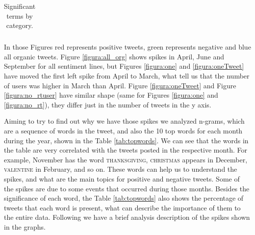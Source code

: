 \documentclass{sig-alternate}
\begin{document}
\begin{table}[t]
\centering
\caption{Significant terms by category.}
\label{tab:terms}
\begin{tabular}{|r|p{14cm}| }
\hline

\hline
\end{tabular}
\end{table}




 In those Figures red represents positive tweets, green represents negative and blue all organic tweets. Figure \ref{figura:all_org} shows spikes in April, June and September for all sentiment lines, but Figures \ref{figura:one} and \ref{figura:oneTweet} have moved the first left spike from April to March, what tell us that the number of users was higher in March than April. Figure \ref{figura:oneTweet} and Figure \ref{figura:no_rtuser} have similar shape (same for 
Figures \ref{figura:one} and \ref{figura:no_rt}), they differ just in the number of tweets in the y axis. 

Aiming to try to find out why we have those spikes we analyzed n-grams, which are a sequence of words in the tweet, and also the 10 top words for each month during the year, shown in the Table \ref{tab:topwords}. We can see that the words in the table are very correlated with the tweets posted in the respective month. For example, November has the word \textsc{thanksgiving}, \textsc{christmas} appears in December, \textsc{valentine} in February, and so on. These words can help us to understand the spikes, and what are the main topics for positive and negative tweets. Some of the spikes are due to some events that occurred during those months. Besides the significance of each word, the Table \ref{tab:topwords} also shows the percentage of tweets that each word is present, what can describe the importance of them to the entire data. Following we have a brief analysis description of the spikes shown in the graphs. \\
\end{document}
